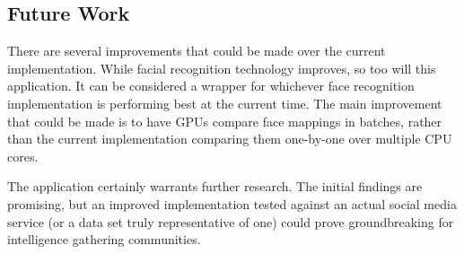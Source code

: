 \documentclass[12pt]{article}
\begin{document}
\subsection{Future Work}
There are several improvements that could be made over the current implementation. While facial recognition technology improves, so too will this application. It can be considered a wrapper for whichever face recognition implementation is performing best at the current time. The main improvement that could be made is to have GPUs compare face mappings in batches, rather than the current implementation comparing them one-by-one over multiple CPU cores.

The application certainly warrants further research. The initial findings are promising, but an improved implementation tested against an actual social media service (or a data set truly representative of one) could prove groundbreaking for intelligence gathering communities.

\newpage

\end{document}
